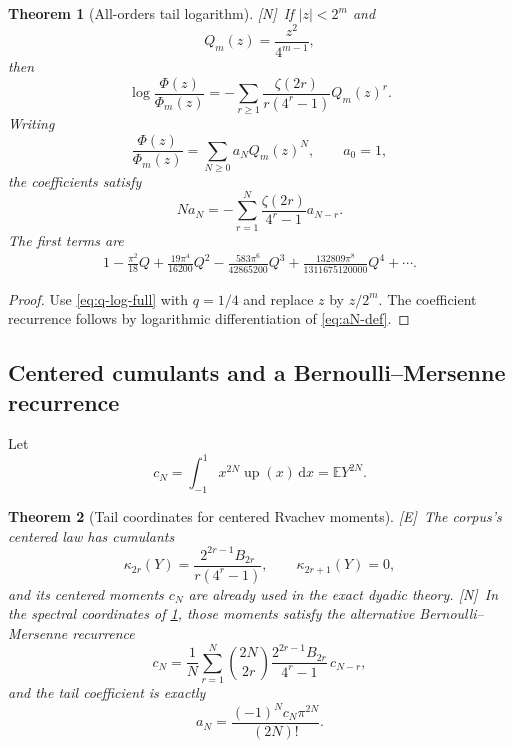 \documentclass[11pt,oneside]{article}
\newtheorem{theorem}{Theorem}[section]
\theoremstyle{definition}
\theoremstyle{remark}
\newcommand{\E}{\mathbb E}
\newcommand{\Up}{\operatorname{up}}
\newcommand{\dd}{\,\mathrm d}
\newcommand{\statusE}{\textsf{[E]}}
\newcommand{\statusN}{\textsf{[N]}}
\begin{document}
\begin{theorem}[All-orders tail logarithm]\label{thm:tail-log}
\statusN\ If $|z|<2^m$ and
\begin{equation}
 Q_m(z)=\frac{z^2}{4^{m-1}},                               \label{eq:Qm}
\end{equation}
then
\begin{equation}
 \boxed{
 \log\frac{\Phi(z)}{\Phi_m(z)}
 =-\sum_{r\ge1}\frac{\zeta(2r)}{r(4^r-1)}Q_m(z)^r.}       \label{eq:tail-log}
\end{equation}
Writing
\begin{equation}
 \frac{\Phi(z)}{\Phi_m(z)}=\sum_{N\ge0}a_NQ_m(z)^N,
 \qquad a_0=1,                                             \label{eq:aN-def}
\end{equation}
the coefficients satisfy
\begin{equation}
 \boxed{
 Na_N=-\sum_{r=1}^{N}\frac{\zeta(2r)}{4^r-1}a_{N-r}.}     \label{eq:aN-rec}
\end{equation}
The first terms are
\begin{align}
 1-\frac{\pi^2}{18}Q
 +\frac{19\pi^4}{16200}Q^2
 -\frac{583\pi^6}{42865200}Q^3
 +\frac{132809\pi^8}{1311675120000}Q^4+\cdots.            \label{eq:tail-first}
\end{align}
\end{theorem}

\begin{proof}
Use \eqref{eq:q-log-full} with $q=1/4$ and replace $z$ by $z/2^m$.
The coefficient recurrence follows by logarithmic differentiation of
\eqref{eq:aN-def}.
\end{proof}

\subsection{Centered cumulants and a Bernoulli--Mersenne recurrence}
Let
\begin{equation}
 c_N=\int_{-1}^{1}x^{2N}\Up(x)\dd x=\E Y^{2N}.             \label{eq:cN}
\end{equation}

\begin{theorem}[Tail coordinates for centered Rvachev moments]\label{thm:centered-cumulants}
\statusE\ The corpus's centered law has cumulants
\begin{equation}
 \boxed{
 \kappa_{2r}(Y)=\frac{2^{2r-1}B_{2r}}{r(4^r-1)},
 \qquad \kappa_{2r+1}(Y)=0,}                               \label{eq:centered-cumulants}
\end{equation}
and its centered moments $c_N$ are already used in the exact dyadic theory.
\statusN\ In the spectral coordinates of \cref{thm:tail-log}, those moments satisfy the
alternative Bernoulli--Mersenne recurrence
\begin{equation}
 \boxed{
 c_N=\frac1N\sum_{r=1}^{N}\binom{2N}{2r}
 \frac{2^{2r-1}B_{2r}}{4^r-1}\,c_{N-r},}                 \label{eq:centered-moment-rec}
\end{equation}
and the tail coefficient is exactly
\begin{equation}
 \boxed{a_N=\frac{(-1)^Nc_N\pi^{2N}}{(2N)!}.}             \label{eq:aN-cN}
\end{equation}
\end{theorem}
\end{document}
